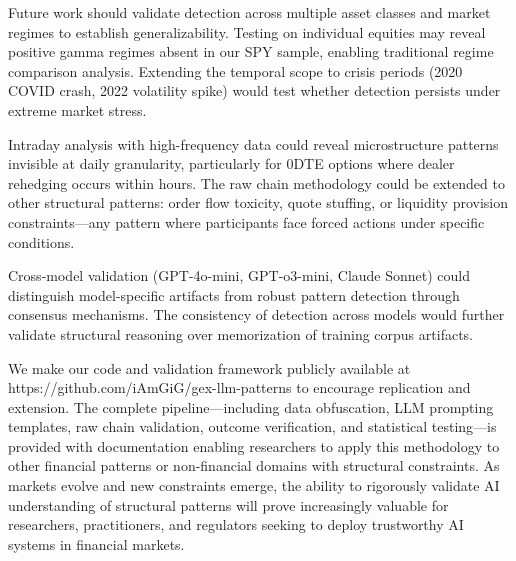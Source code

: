 Future work should validate detection across multiple asset classes and market regimes to establish generalizability. Testing on individual equities may reveal positive gamma regimes absent in our SPY sample, enabling traditional regime comparison analysis. Extending the temporal scope to crisis periods (2020 COVID crash, 2022 volatility spike) would test whether detection persists under extreme market stress.

Intraday analysis with high-frequency data could reveal microstructure patterns invisible at daily granularity, particularly for 0DTE options where dealer rehedging occurs within hours. The raw chain methodology could be extended to other structural patterns: order flow toxicity, quote stuffing, or liquidity provision constraints—any pattern where participants face forced actions under specific conditions.

Cross-model validation (GPT-4o-mini, GPT-o3-mini, Claude Sonnet) could distinguish model-specific artifacts from robust pattern detection through consensus mechanisms. The consistency of detection across models would further validate structural reasoning over memorization of training corpus artifacts.

We make our code and validation framework publicly available at https://github.com/iAmGiG/gex-llm-patterns to encourage replication and extension. The complete pipeline—including data obfuscation, LLM prompting templates, raw chain validation, outcome verification, and statistical testing—is provided with documentation enabling researchers to apply this methodology to other financial patterns or non-financial domains with structural constraints. As markets evolve and new constraints emerge, the ability to rigorously validate AI understanding of structural patterns will prove increasingly valuable for researchers, practitioners, and regulators seeking to deploy trustworthy AI systems in financial markets.
